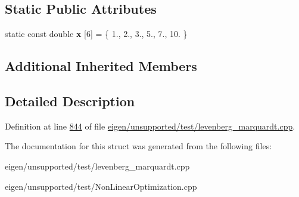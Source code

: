 \subsection*{Static Public Attributes}
\begin{DoxyCompactItemize}
\item 
\mbox{\label{struct_box_b_o_d__functor_ab68334697b6e017bbe59fcb1740c55a8}} 
static const double {\bfseries x} \mbox{[}6\mbox{]} = \{ 1., 2., 3., 5., 7., 10. \}
\end{DoxyCompactItemize}
\subsection*{Additional Inherited Members}


\subsection{Detailed Description}


Definition at line \hyperlink{eigen_2unsupported_2test_2levenberg__marquardt_8cpp_source_l00844}{844} of file \hyperlink{eigen_2unsupported_2test_2levenberg__marquardt_8cpp_source}{eigen/unsupported/test/levenberg\+\_\+marquardt.\+cpp}.



The documentation for this struct was generated from the following files\+:\begin{DoxyCompactItemize}
\item 
eigen/unsupported/test/levenberg\+\_\+marquardt.\+cpp\item 
eigen/unsupported/test/\+Non\+Linear\+Optimization.\+cpp\end{DoxyCompactItemize}
